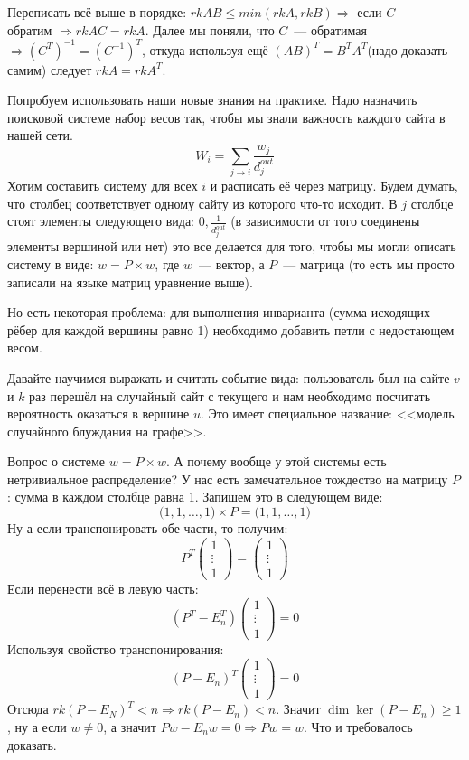 \begin{motivation}
    Переписать всё выше в порядке:
    $rkAB\le min(rkA, rkB)\Rightarrow$ если $C$~--- обратим
    $\Rightarrow rkAC = rkA$.
    Далее мы поняли, что $C$~--- обратимая $\Rightarrow 
    (C^T)^{-1}=(C^{-1})^T$, откуда используя ещё 
    $(AB)^T=B^TA^T$(надо доказать самим) следует
    $rkA = rk A^T$.
\end{motivation}
\begin{example}
    Попробуем использовать наши новые знания на практике.
    Надо назначить поисковой системе набор весов так, чтобы
    мы знали важность каждого сайта в нашей сети.
    $$W_i = \sum_{j\rightarrow i} \frac{w_j}{d_j^{out}}$$
    Хотим составить систему для всех $i$ и расписать
    её через матрицу. Будем думать, что столбец соответствует
    одному сайту из которого что-то исходит. В $j$ столбце
    стоят элементы следующего вида: $0, \frac{1}{d^{out}_j}$
    (в зависимости от того соединены элементы вершиной или нет)
    это все делается для того, чтобы мы могли описать систему
    в виде: $w = P\times w$, где $w$~--- вектор, а $P$~--- матрица
    (то есть мы просто записали на языке матриц уравнение выше).

    Но есть некоторая проблема: для выполнения инварианта
    (сумма исходящих рёбер для каждой вершины равно 1) необходимо
    добавить петли с недостающем весом.

    Давайте научимся выражать и считать событие вида: 
    пользователь был на сайте $v$ и $k$ раз перешёл на случайный
    сайт с текущего и нам необходимо посчитать вероятность
    оказаться в вершине $u$. Это имеет специальное название:
    <<модель случайного блуждания на графе>>. 

    Вопрос о системе $w = P\times w$. А почему вообще у этой
    системы есть нетривиальное распределение? У нас есть
    замечательное тождество на матрицу $P$: сумма в каждом
    столбце равна 1. Запишем это в следующем виде:
    $$\big(1,1,\dots, 1\big)\times P = \big(1,1,\dots, 1\big)$$
    Ну а если транспонировать обе части, то получим:
    $$
    P^T\begin{pmatrix}
        1\\\vdots\\1
    \end{pmatrix} = 
    \begin{pmatrix}
        1\\\vdots\\1
    \end{pmatrix}
    $$
    Если перенести всё в левую часть:
    $$
    (P^T - E_n^T)\begin{pmatrix}
        1\\\vdots\\1
    \end{pmatrix} = 0
    $$
    Используя свойство транспонирования:
    $$
    (P - E_n)^T\begin{pmatrix}
        1\\\vdots\\1
    \end{pmatrix} = 0
    $$
    Отсюда $rk(P - E_N)^T<n \Rightarrow rk(P - E_n)<n$.
    Значит $\dim \ker(P - E_n) \ge 1$, ну а если $w\not=0$,
    а значит $Pw -  E_nw = 0\Rightarrow Pw = w$.
    Что и требовалось доказать.


\end{example}
